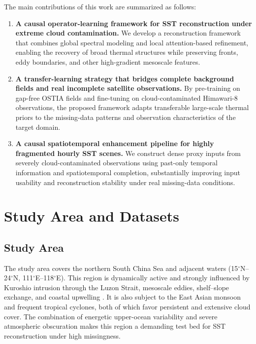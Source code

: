 \documentclass[12pt,reqno]{amsart}
\begin{document}
The main contributions of this work are summarized as follows:

\begin{enumerate}

\item \textbf{A causal operator-learning framework for SST reconstruction under extreme cloud contamination.}
We develop a reconstruction framework that combines global spectral modeling and local attention-based refinement, enabling the recovery of broad thermal structures while preserving fronts, eddy boundaries, and other high-gradient mesoscale features.

\item \textbf{A transfer-learning strategy that bridges complete background fields and real incomplete satellite observations.}
By pre-training on gap-free OSTIA fields and fine-tuning on cloud-contaminated Himawari-8 observations, the proposed framework adapts transferable large-scale thermal priors to the missing-data patterns and observation characteristics of the target domain.

\item \textbf{A causal spatiotemporal enhancement pipeline for highly fragmented hourly SST scenes.}
We construct dense proxy inputs from severely cloud-contaminated observations using past-only temporal information and spatiotemporal completion, substantially improving input usability and reconstruction stability under real missing-data conditions.

\end{enumerate}






\section{Study Area and Datasets}

\subsection{Study Area}

The study area covers the northern South China Sea and adjacent waters (15$^\circ$N--24$^\circ$N, 111$^\circ$E--118$^\circ$E). This region is dynamically active and strongly influenced by Kuroshio intrusion through the Luzon Strait, mesoscale eddies, shelf--slope exchange, and coastal upwelling \cite{nan2015kuroshio,wang2003mesoscale}. It is also subject to the East Asian monsoon and frequent tropical cyclones, both of which favor persistent and extensive cloud cover. The combination of energetic upper-ocean variability and severe atmospheric obscuration makes this region a demanding test bed for SST reconstruction under high missingness.
\end{document}
